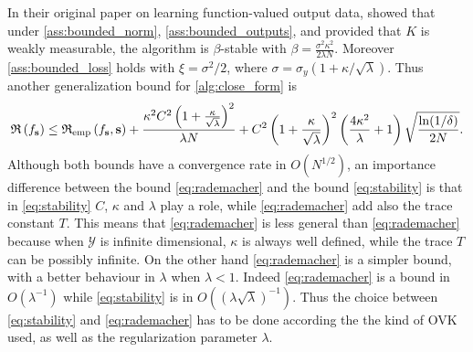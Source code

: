 In their original paper on learning function-valued output data,
\citet{kadri2015operator} showed that under \cref{ass:bounded_norm},
\cref{ass:bounded_outputs}, and provided that $K$ is weakly measurable, the
algorithm is $\beta$-stable with $\beta=\frac{\sigma^2\kappa^2}{2\lambda N}$.
Moreover \cref{ass:bounded_loss} holds with $\xi=\sigma^2 / 2$, where
$\sigma=\sigma_y(1 + \kappa/\sqrt{\lambda})$.  Thus another generalization bound
for \cref{alg:close_form} is
\begin{dmath}
    \label{eq:stability}
    \risk{f_{\seq{s}}} \le \riskemp{f_{\seq{s}}, \seq{s}}  + \frac{\kappa^2 C^2
    \left(1 + \frac{\kappa}{\sqrt{\lambda}} \right)^2 }{\lambda N} + C^2\left(
    1 + \frac{\kappa}{\sqrt{\lambda}} \right)^2\left( \frac{4\kappa^2}{\lambda}
    + 1 \right)\sqrt{\frac{\ln(1/\delta)}{2N}}.
\end{dmath}
Although both bounds have a convergence rate in $O(N^{1/2})$, an importance
difference between the bound \cref{eq:rademacher} and the bound
\cref{eq:stability} is that in \cref{eq:stability} $C$, $\kappa$ and $\lambda$
play a role, while \cref{eq:rademacher} add also the trace constant $T$. This
means that \cref{eq:rademacher} is less general than \cref{eq:rademacher}
because when $\mathcal{Y}$ is infinite dimensional, $\kappa$ is always well
defined, while the trace $T$ can be possibly infinite. On the other hand
\cref{eq:rademacher} is a simpler bound, with a better behaviour in $\lambda$
when $\lambda<1$. Indeed \cref{eq:rademacher} is a bound in $O(\lambda^{-1})$
while \cref{eq:stability} is in $O((\lambda\sqrt{\lambda})^{-1})$. Thus the
choice between \cref{eq:stability} and \cref{eq:rademacher} has to be done
according the the kind of \acs{OVK} used, as well as the regularization
parameter $\lambda$.

